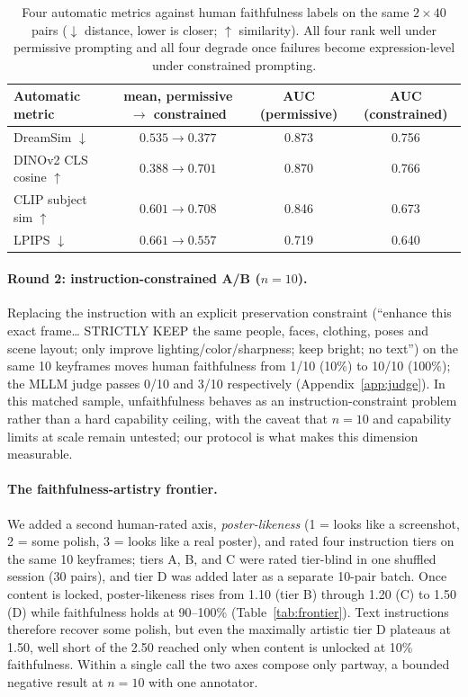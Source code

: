 \begin{table}[t]
\centering
\small
\begin{tabular}{lccc}
\toprule
Automatic metric & mean, permissive $\rightarrow$ constrained & AUC (permissive) & AUC (constrained) \\
\midrule
DreamSim $\downarrow$ & $0.535 \rightarrow 0.377$ & 0.873 & 0.756 \\
DINOv2 CLS cosine $\uparrow$ & $0.388 \rightarrow 0.701$ & 0.870 & 0.766 \\
CLIP subject sim $\uparrow$ & $0.601 \rightarrow 0.708$ & 0.846 & 0.673 \\
LPIPS $\downarrow$ & $0.661 \rightarrow 0.557$ & 0.719 & 0.640 \\
\bottomrule
\end{tabular}
\caption{Four automatic metrics against human faithfulness labels on the same $2{\times}40$ pairs ($\downarrow$ distance, lower is closer; $\uparrow$ similarity). All four rank well under permissive prompting and all four degrade once failures become expression-level under constrained prompting.}
\label{tab:metricfamily}
\end{table}

\paragraph{Round 2: instruction-constrained A/B ($n=10$).}
Replacing the instruction with an explicit preservation constraint (``enhance this exact frame\ldots{} STRICTLY KEEP the same people, faces, clothing, poses and scene layout; only improve lighting/color/sharpness; keep bright; no text'') on the same 10 keyframes moves human faithfulness from 1/10 (10\%) to 10/10 (100\%); the MLLM judge passes 0/10 and 3/10 respectively (Appendix~\ref{app:judge}). In this matched sample, unfaithfulness behaves as an instruction-constraint problem rather than a hard capability ceiling, with the caveat that $n=10$ and capability limits at scale remain untested; our protocol is what makes this dimension measurable.

\paragraph{The faithfulness-artistry frontier.}
We added a second human-rated axis, \emph{poster-likeness} (1 = looks like a screenshot, 2 = some polish, 3 = looks like a real poster), and rated four instruction tiers on the same 10 keyframes; tiers A, B, and C were rated tier-blind in one shuffled session (30 pairs), and tier D was added later as a separate 10-pair batch. Once content is locked, poster-likeness rises from 1.10 (tier B) through 1.20 (C) to 1.50 (D) while faithfulness holds at 90--100\% (Table~\ref{tab:frontier}). Text instructions therefore recover some polish, but even the maximally artistic tier D plateaus at 1.50, well short of the 2.50 reached only when content is unlocked at 10\% faithfulness. Within a single call the two axes compose only partway, a bounded negative result at $n=10$ with one annotator.


